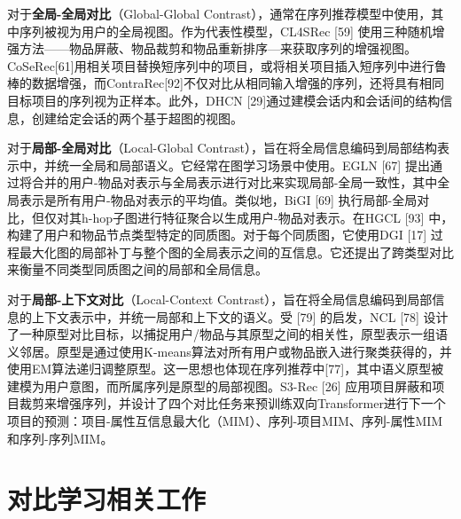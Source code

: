 对于\textbf{全局-全局对比}（Global-Global Contrast），通常在序列推荐模型中使用，其中序列被视为用户的全局视图。作为代表性模型，CL4SRec [59] 使用三种随机增强方法——物品屏蔽、物品裁剪和物品重新排序—来获取序列的增强视图。CoSeRec[61]用相关项目替换短序列中的项目，或将相关项目插入短序列中进行鲁棒的数据增强，而ContraRec[92]不仅对比从相同输入增强的序列，还将具有相同目标项目的序列视为正样本。此外，DHCN [29]通过建模会话内和会话间的结构信息，创建给定会话的两个基于超图的视图。

对于\textbf{局部-全局对比}（Local-Global Contrast），旨在将全局信息编码到局部结构表示中，并统一全局和局部语义。它经常在图学习场景中使用。EGLN [67] 提出通过将合并的用户-物品对表示与全局表示进行对比来实现局部-全局一致性，其中全局表示是所有用户-物品对表示的平均值。类似地，BiGI [69] 执行局部-全局对比，但仅对其h-hop子图进行特征聚合以生成用户-物品对表示。在HGCL [93] 中，构建了用户和物品节点类型特定的同质图。对于每个同质图，它使用DGI [17] 过程最大化图的局部补丁与整个图的全局表示之间的互信息。它还提出了跨类型对比来衡量不同类型同质图之间的局部和全局信息。

对于\textbf{局部-上下文对比}（Local-Context Contrast），旨在将全局信息编码到局部信息的上下文表示中，并统一局部和上下文的语义。受 [79] 的启发，NCL [78] 设计了一种原型对比目标，以捕捉用户/物品与其原型之间的相关性，原型表示一组语义邻居。原型是通过使用K-means算法对所有用户或物品嵌入进行聚类获得的，并使用EM算法递归调整原型。这一思想也体现在序列推荐中[77]，其中语义原型被建模为用户意图，而所属序列是原型的局部视图。S3-Rec [26] 应用项目屏蔽和项目裁剪来增强序列，并设计了四个对比任务来预训练双向Transformer进行下一个项目的预测：项目-属性互信息最大化（MIM）、序列-项目MIM、序列-属性MIM和序列-序列MIM。



\section{对比学习相关工作}

